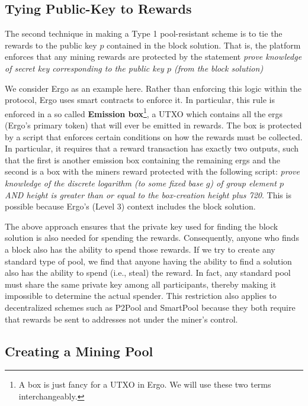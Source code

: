 \documentclass[runningheads]{llncs}
\begin{document}

\subsection{Tying Public-Key to Rewards}

The second technique in making a Type 1 pool-resistant scheme is to tie the rewards to the public key $p$ contained in the block solution. That is, the platform enforces that any mining rewards are protected by the statement {\em prove knowledge of secret key corresponding to the public key $p$ (from the block solution)}

We consider Ergo as an example here. Rather than enforcing this logic within the protocol, Ergo uses smart contracts to enforce it. In particular, this rule is enforced in a so called \textbf{Emission box}\footnote{A box is just fancy for a UTXO in Ergo. We will use these two terms interchangeably.}, a UTXO which contains all the ergs (Ergo's primary token) that will ever be emitted in rewards. The box is protected by a script that enforces certain conditions on how the rewards must be collected. In particular, it requires that a reward transaction has exactly two outputs, such that the first is another emission box containing the remaining ergs and the second is a box with the miners reward protected with the following script: {\em prove knowledge of the discrete logarithm (to some fixed base $g$) of group element $p$ AND height is greater than or equal to the box-creation height plus 720}.
This is possible because Ergo's (Level 3) context includes the block solution.  

The above approach ensures that the private key used for finding the block solution is also needed for spending the rewards. Consequently, anyone who finds a block also has the ability to spend those rewards. 
If we try to create any standard type of pool, we find that anyone having the ability to find a solution also has the ability to spend (i.e., steal) the reward. In fact, any standard pool must share the same private key among all participants, thereby making it impossible to determine the actual spender. This restriction also applies to decentralized schemes such as P2Pool and SmartPool because they both require that rewards be sent to addresses not under the miner's control.

\subsection{Creating a Mining Pool}
\end{document}

